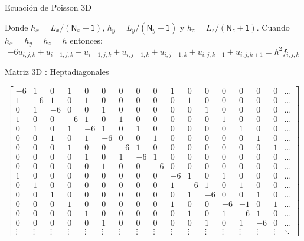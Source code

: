 \documentclass{beamer}
\begin{document}
\begin{frame}{Ecuaci\'on de Poisson 3D}
\begin{small}
Donde $h_x = L_x / (\textsf{N}_x + \textsf{1})$, $h_y = L_y / (\textsf{N}_y + \textsf{1})$ y $h_z = L_z / (\textsf{N}_z + \textsf{1})$. 
Cuando $h_x = h_y = h_z = h$ entonces:
\[
\boxed{-6u_{i,j,k} +  u_{i-1,j,k} + u_{i+1,j,k} + u_{i,j-1,k} + u_{i,j+1,k} + u_{i,j,k-1} + u_{i,j,k+1} = h^2 f_{i,j,k}}
\]
\end{small}


\end{frame}

\begin{frame}{Matriz 3D : Heptadiagonales}

\begin{tiny}
\[
\left[
\begin{array}{ccc|ccc|ccc||ccc|ccc|cc}
-6 & 1 & 0 & 1 & 0 & 0 & 0 & 0 & 0 & 1 & 0 & 0 & 0 & 0 & 0 & 0 & \dots\\
1 &-6 & 1 & 0 & 1 & 0 & 0 & 0 & 0 & 0 & 1 & 0 & 0 & 0 & 0 & 0 & \dots\\
0 & 1 &-6 & 0 & 0 & 1 & 0 & 0 & 0 & 0 & 0 & 1 & 0 & 0 & 0 & 0 & \dots\\
\hline
1 & 0 & 0 &-6 & 1 & 0 & 1 & 0 & 0 & 0 & 0 & 0 & 1 & 0 & 0 & 0 & \dots\\
0 & 1 & 0 & 1 &-6 & 1 & 0 & 1 & 0 & 0 & 0 & 0 & 0 & 1 & 0 & 0 & \dots\\
0 & 0 & 1 & 0 & 1 &-6 & 0 & 0 & 1 & 0 & 0 & 0 & 0 & 0 & 1 & 0 & \dots\\
\hline
0 & 0 & 0 & 1 & 0 & 0 &-6 & 1 & 0 & 0 & 0 & 0 & 0 & 0 & 0 & 1 & \dots\\
0 & 0 & 0 & 0 & 1 & 0 & 1 &-6 & 1 & 0 & 0 & 0 & 0 & 0 & 0 & 0 & \dots\\
0 & 0 & 0 & 0 & 0 & 1 & 0 & 0 &-6 & 0 & 0 & 0 & 0 & 0 & 0 & 0 & \dots\\
\hline
\hline
1 & 0 & 0 & 0 & 0 & 0 & 0 & 0 & 0 &-6 & 1 & 0 & 1 & 0 & 0 & 0 & \dots\\
0 & 1 & 0 & 0 & 0 & 0 & 0 & 0 & 0 & 1 &-6 & 1 & 0 & 1 & 0 & 0 & \dots\\
0 & 0 & 1 & 0 & 0 & 0 & 0 & 0 & 0 &0 & 1 &-6 & 0 & 0 & 1 & 0 & \dots\\
\hline
0 & 0 & 0 & 1 & 0 & 0 & 0 & 0 & 0 & 1 & 0 & 0 &-6 &-1 & 0 & 1 & \dots\\
0 & 0 & 0 & 0 & 1 & 0 & 0 & 0 & 0 & 0 & 1 & 0 & 1 &-6 & 1 & 0 & \dots\\
0 & 0 & 0 & 0 & 0 & 1 & 0 & 0 & 0 & 0 & 0 & 1 & 0 & 1 &-6 & 0 & \dots\\
\vdots & \vdots & \vdots & \vdots & \vdots & \vdots & \vdots & \vdots & \vdots & \vdots 
& \vdots & \vdots & \vdots & \vdots & \vdots & \vdots
& \ddots 
\end{array} \right]
\]
\end{tiny}

\end{frame}
\end{document}

